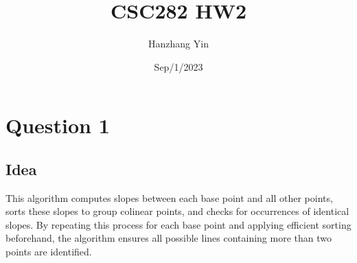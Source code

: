 \documentclass{article}
\title{CSC282 HW2}
\author{Hanzhang Yin}
\date{Sep/1/2023}
\begin{document}
\maketitle

\section*{Question 1}

\subsection*{Idea}
This algorithm computes slopes between each base point and all other points, sorts these slopes to group colinear points, and checks for occurrences of identical slopes. By repeating this process for each base point and applying efficient sorting beforehand, the algorithm ensures all possible lines containing more than two points are identified.
\end{document}
